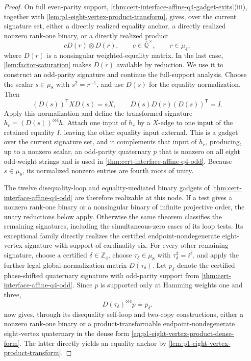 \documentclass[11pt,letterpaper,onecolumn]{article}
\theoremstyle{plain}
\theoremstyle{definition}
\theoremstyle{remark}
\newcommand{\AlgNums}{\overline{\mathbb Q}}
\begin{document}
\begin{proof}
On full even-parity support,
\cref{thm:cert-interface-affine-q4-gadget-exits}\textnormal{(iii)}, together with
\cref{lem:p1-eight-vertex-product-transform}, gives, over the current signature set,
either a directly realized equality anchor, a directly realized nonzero
rank-one binary, or a directly realized product
\[
  cD(r)\otimes D(r),
  \qquad c\in\AlgNums^\times,
  \qquad r\in\mu_4,
\]
where \(D(r)\) is a nonsingular weighted-equality matrix.
In the last case, \cref{lem:factor-saturation} makes \(D(r)\) available
by reduction. We use it to construct an odd-parity signature and continue
the full-support analysis. Choose
the scalar \(s\in\mu_8\) with \(s^2=r^{-1}\), and use \(D(s)\) for the equality normalization.  Then
\[
  (D(s))^{\mathsf T}XD(s)=sX,
  \qquad
  D(s)D(r)(D(s))^{\mathsf T}=I.
\]
Apply this normalization and define
the transformed signature \(h_r=(D(s))^{\otimes4}h\). Attach one input of
\(h_r\) by a \(X\)-edge
to one input of the retained equality \(I\), leaving the other equality input
external.  This is a gadget over the current signature set,
and it complements that input of \(h_r\), producing, up to a nonzero scalar, an odd-parity quaternary \(p\) that is nonzero on all eight
odd-weight strings and is used in
\cref{thm:cert-interface-affine-q4-odd}.  Because \(s\in\mu_8\), its normalized
nonzero entries are fourth roots of unity.

The twelve disequality-loop and equality-mediated binary gadgets of
\cref{thm:cert-interface-affine-q4-odd} are therefore realizable at this node.  If a test gives a nonzero rank-one binary or a nonsingular binary of
infinite projective order, the unary reductions below apply. Otherwise
the same theorem classifies the remaining signatures, including the
simultaneous-zero cases of its loop tests. Its exceptional family directly
realizes the certified endpoint-nondegenerate eight-vertex signature with
support of cardinality six.  For every other remaining signature, choose a certified
\(\delta\in\mathbb Z_4\), choose \(\tau_\delta\in\mu_8\) with
\(\tau_\delta^2=i^\delta\), and apply the further legal global-normalization
matrix \(D(\tau_\delta)\).  Let \(p_\delta\) denote the certified
phase-shifted quaternary signature with odd-parity support from
\cref{thm:cert-interface-affine-q4-odd}.  Since \(p\) is supported only at
Hamming weights one and three,
\[
  D(\tau_\delta)^{\otimes4}p\doteq p_\delta.
\]
 now gives, through its disequality self-loop
and two-copy constructions, either a nonzero rank-one binary or a
product-transformable endpoint-nondegenerate eight-vertex quaternary in the
dense form \cref{eq:p1-eight-vertex-product-dense-form}. The latter directly
yields an equality anchor by
\cref{lem:p1-eight-vertex-product-transform}.


\end{proof}
\end{document}
